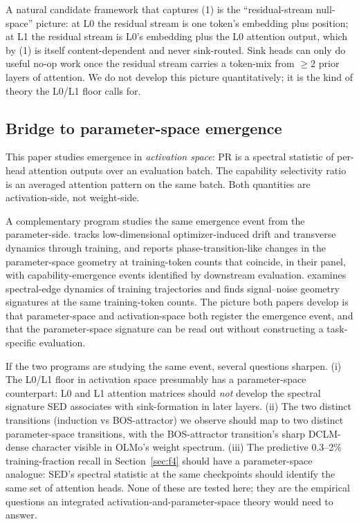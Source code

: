 \documentclass[11pt]{article}
\begin{document}
A natural candidate framework that captures (1) is the
``residual-stream null-space'' picture: at L0 the residual stream is one
token's embedding plus position; at L1 the residual stream is L0's
embedding plus the L0 attention output, which by (1) is itself
content-dependent and never sink-routed. Sink heads can only do useful
no-op work once the residual stream carries a token-mix from
$\ge\!2$ prior layers of attention. We do not develop this picture
quantitatively; it is the kind of theory the L0/L1 floor calls for.

\subsection{Bridge to parameter-space emergence}

This paper studies emergence in \emph{activation space}: PR is a
spectral statistic of per-head attention outputs over an evaluation
batch. The capability selectivity ratio is an averaged attention pattern
on the same batch. Both quantities are activation-side, not
weight-side.

A complementary program studies the same emergence event from the
parameter-side. \citet{xu2026sed} tracks low-dimensional optimizer-induced
drift and transverse dynamics through training, and reports
phase-transition-like changes in the parameter-space geometry at
training-token counts that coincide, in their panel, with
capability-emergence events identified by downstream evaluation.
\citet{xu2026lch} examines spectral-edge dynamics of training
trajectories and finds signal--noise geometry signatures at the same
training-token counts. The picture both papers develop is that
parameter-space and activation-space both register the emergence event,
and that the parameter-space signature can be read out without
constructing a task-specific evaluation.

If the two programs are studying the same event, several questions
sharpen. (i) The L0/L1 floor in activation space presumably has a
parameter-space counterpart: L0 and L1 attention matrices should
\emph{not} develop the spectral signature SED associates with
sink-formation in later layers. (ii) The two distinct transitions
(induction vs BOS-attractor) we observe should map to two distinct
parameter-space transitions, with the BOS-attractor transition's sharp
DCLM-dense character visible in OLMo's weight spectrum. (iii) The
predictive 0.3--2\% training-fraction recall in Section~\ref{sec:f4}
should have a parameter-space analogue: SED's spectral statistic at the
same checkpoints should identify the same set of attention heads. None
of these are tested here; they are the empirical questions an integrated
activation-and-parameter-space theory would need to answer.
\end{document}
